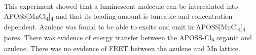     {
    This experiment showed that a luminescent molecule can be intercalated into APOSS[MnCl\textsubscript{4}]\textsubscript{4} and that its loading amount is tuneable and concentration-dependent. Azulene was found to be able to excite and emit in APOSS[MnCl\textsubscript{4}]\textsubscript{4} pores. There was evidence of energy transfer between the APOSS-Cl\textsubscript{8} organic and azulene. There was no evidence of FRET between the azulene and Mn lattice. 
    }

    \newpage
    